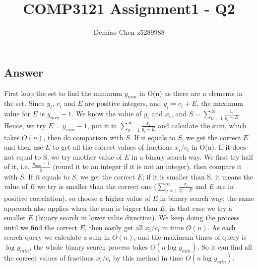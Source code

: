 \documentclass[12pt]{article}
\title{COMP3121 Assignment1 - Q2}
\author{Demiao Chen z5289988}
\begin{document}
\maketitle
{}

\subsection*{Answer}
First loop the set to find the minimum $y_{min}$ in O(n) as there
are n elements in the set. Since $y_i$, $c_i$ and $E$ are positive
integers, and $y_i = c_i + E$, the maximum value for $E$ is $y_{min} - 1$.
We know the value of $y_i$ and $x_i$, and $S =
\sum_{n = 1}^{\infty} \frac{x_i}{y_i-E} $. Hence, we try 
$E = y_{min} - 1$, put it in $
\sum_{n = 1}^{\infty} \frac{x_i}{y_i-E} $ and calculate the sum, which takes
$O(n)$, then do comparison with $S$. If it equals to $S$, we get the correct $E$ and 
then use $E$ to get all the correct values of fractions $x_i/c_i$ in O(n).
If it does not equal to S, we try another value of $E$ in 
a binary search way. We first try half of it, i.e. $
\frac{y_{min} - 1}{2}$ (round it to an integer if it is not an integer), then
compare it with $S$. If it equals to $S$, we get the correct $E$; if it is smaller
than S, it means the value of $E$ we try is smaller than the correct one
($\sum_{n = 1}^{\infty} \frac{x_i}{y_i-E}$ and $E$ are in positive correlation),
so choose a higher value of $E$ in binary search way; the same approach also 
applies when the sum is bigger than $E$, in that case we try a smaller $E$ (binary 
search in lower value direction).
 We keep doing the process until 
we find the correct $E$, then easily get all ${x_i}/{c_i}$ in time $O(n)$. As each search query we calculate a sum in $O(n)$, and the 
maximum times of query is $\log{y_{min}}$, the whole binary search process takes $O(n\log{y_{min}})$. 
So it can find all the correct values of fractions ${x_i}/{c_i}$ by this
method in time $O(n\log{y_{min}})$.
\end{document}
